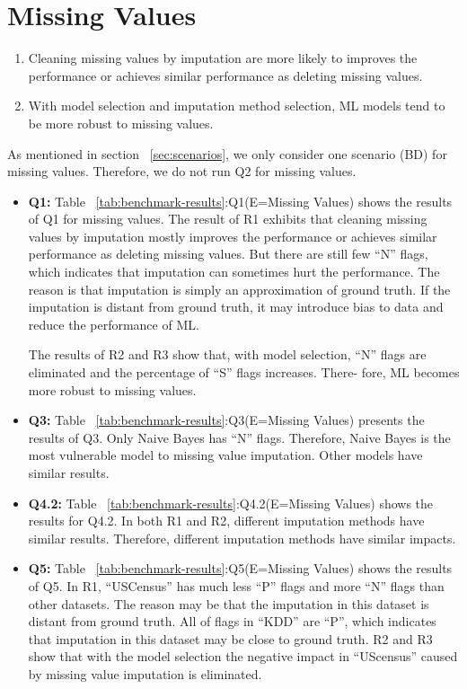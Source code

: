\section{Missing Values} \label{sec:missing-values}

\begin{enumerate}
	\item{Cleaning missing values by imputation are more likely
		to improves the performance or achieves similar performance as deleting missing values.
	}
	\item {
		With model selection and imputation method selection, ML models tend to be more robust to missing values.
	}
\end{enumerate}

As mentioned in section ~\ref{sec:scenarios}, we only consider one scenario (BD)
for missing values. Therefore, we do not run Q2 for missing values.

\begin{itemize}
	\item {
		\textbf{Q1:} Table ~\ref{tab:benchmark-results}:Q1(E=Missing Values) shows the results of Q1
		for missing values. The result of R1 exhibits that cleaning missing
		values by imputation mostly improves the performance or achieves
		similar performance as deleting missing values. But there are still
		few “N” flags, which indicates that imputation can sometimes hurt
		the performance. The reason is that imputation is simply an approximation of ground truth. If the imputation is distant from ground truth, it may introduce bias to data and reduce the performance of ML.
		
		The results of R2 and R3 show that, with model selection, “N”
		flags are eliminated and the percentage of “S” flags increases. There-
		fore, ML becomes more robust to missing values.
	}
	\item {
		\textbf{Q3:} Table ~\ref{tab:benchmark-results}:Q3(E=Missing Values) presents the results of Q3.
		Only Naive Bayes has “N” flags. Therefore, Naive Bayes is the most vulnerable model to missing value imputation. Other models have similar results.
	}
	\item {
		\textbf{Q4.2:} Table ~\ref{tab:benchmark-results}:Q4.2(E=Missing Values) shows the results for
		Q4.2. In both R1 and R2, different imputation methods have similar results. Therefore, different imputation methods have similar impacts.
	}
	\item {
		\textbf{Q5:} Table ~\ref{tab:benchmark-results}:Q5(E=Missing Values) shows the results of Q5.
		In R1, “USCensus” has much less “P” flags and more “N” flags than other datasets. The reason may be that the imputation in this dataset is distant from ground truth. All of flags in “KDD” are “P”, which indicates that imputation in this dataset may be close to ground truth. R2 and R3 show that with the model selection the negative impact in “UScensus” caused by missing value imputation
		is eliminated.
	}
\end{itemize}


